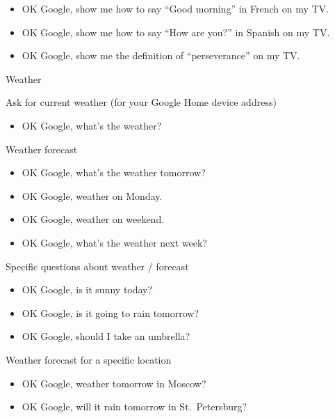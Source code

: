 \documentclass[
  a4paper,
]{article}
\providecommand{\tightlist}{%
  \setlength{\itemsep}{0pt}\setlength{\parskip}{0pt}}\usepackage{longtable,booktabs,array}
\begin{document}
\begin{itemize}
\item
  OK Google, show me how to say ``Good morning'' in French on my TV.
\item
  OK Google, show me how to say ``How are you?'' in Spanish on my TV.
\item
  OK Google, show me the definition of ``perseverance'' on my TV.
\end{itemize}

Weather

Ask for current weather (for your Google Home device address)

\begin{itemize}
\tightlist
\item
  OK Google, what's the weather?
\end{itemize}

Weather forecast

\begin{itemize}
\item
  OK Google, what's the weather tomorrow?
\item
  OK Google, weather on Monday.
\item
  OK Google, weather on weekend.
\item
  OK Google, what's the weather next week?
\end{itemize}

Specific questions about weather / forecast

\begin{itemize}
\item
  OK Google, is it sunny today?
\item
  OK Google, is it going to rain tomorrow?
\item
  OK Google, should I take an umbrella?
\end{itemize}

Weather forecast for a specific location

\begin{itemize}
\item
  OK Google, weather tomorrow in Moscow?
\item
  OK Google, will it rain tomorrow in St.~Petersburg?
\end{itemize}


\printbibliography
\end{document}
